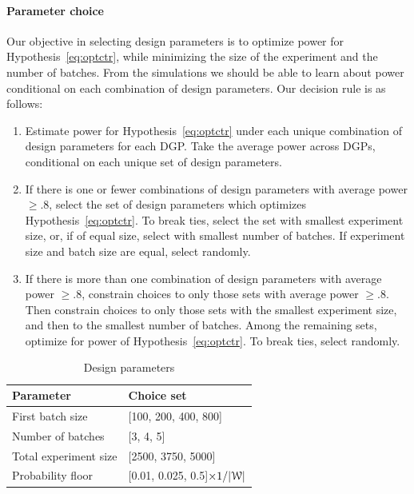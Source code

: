 \documentclass[letterpaper, 12pt, parskip=full,]{scrartcl}
\begin{document}
\paragraph{Parameter choice}
Our objective in selecting design parameters is to optimize power for Hypothesis~\ref{eq:optctr}, while minimizing the size of the experiment and the number of batches. From the simulations we should be able to learn about power conditional on each combination of design parameters. Our decision rule is as follows:
\begin{enumerate}
\item Estimate power for Hypothesis~\ref{eq:optctr} under each unique combination of design parameters for each DGP. Take the average power across DGPs, conditional on each unique set of design parameters. 
\item If there is one or fewer combinations of design parameters with average power $\ge.8$, select the set of design parameters which optimizes Hypothesis~\ref{eq:optctr}. To break ties, select the set with smallest experiment size, or, if of equal size, select with smallest number of batches. If experiment size and batch size are equal, select randomly. 
\item If there is more than one combination of design parameters with average power $\ge.8$, constrain choices to only those sets with average power $\ge.8$. Then constrain choices to only those sets with the smallest experiment size, and then to the smallest number of batches. Among the remaining sets, optimize for power of Hypothesis~\ref{eq:optctr}. To break ties, select randomly. 
\end{enumerate}

\begin{table}[H]
\centering
\caption{Design parameters} 
\label{tab:design}
\begin{tabular}{l | l}
\textbf{Parameter} & \textbf{Choice set} \\ \hline
First batch size & [100, 200, 400, 800] \\
Number of batches & [3, 4, 5] \\
Total experiment size & [2500, 3750, 5000] \\
Probability floor & [0.01, 0.025, 0.5]$\times 1/ |{\EuScript W}|$ \\
\hline
\end{tabular}
\end{table} 
\end{document}
